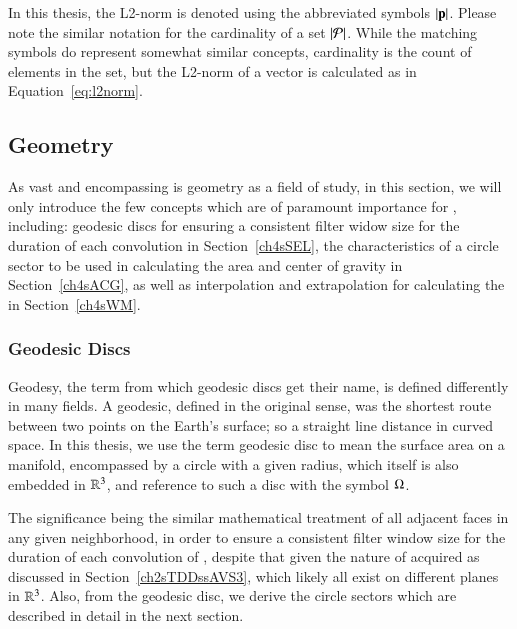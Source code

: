 In this thesis, the L2-norm is denoted using the abbreviated symbols $|\mathbf{p}|$. Please note the similar notation for the cardinality of a set $|\mathcal{P}|$. While the matching symbols do represent somewhat similar concepts, cardinality is the count of elements in the set, but the L2-norm of a vector is calculated as in Equation~\ref{eq:l2norm}.~\cite[p.~26]{Mara12}

%
%
%
%
\subsection{Geometry}
\label{ch2sETBssG}
As vast and encompassing is geometry as a field of study, in this section, we will only introduce the few concepts which are of paramount importance for , including: geodesic discs for ensuring a consistent filter widow size for the duration of each convolution in Section~\ref{ch4sSEL}, the characteristics of a circle sector to be used in calculating the area and center of gravity in Section~\ref{ch4sACG}, as well as interpolation and extrapolation for calculating the  in Section~\ref{ch4sWM}.

%
%
\subsubsection{Geodesic Discs}
\label{ch2sETBssGsssGD}
Geodesy, the term from which geodesic discs get their name, is defined differently in many fields. A geodesic, defined in the original sense, was the shortest route between two points on the Earth's surface; so a straight line distance in curved space. In this thesis, we use the term geodesic disc to mean the surface area on a manifold, encompassed by a circle with a given radius, which itself is also embedded in $\mathbb{R}^{3}$, and reference to such a disc with the symbol $\Omega$.

The significance being the similar mathematical treatment of all adjacent faces in any given neighborhood, in order to ensure a consistent filter window size for the duration of each convolution of , despite that given the nature of acquired \tdd{} as discussed in Section~\ref{ch2sTDDssAVS3}, which likely all exist on different planes in $\mathbb{R}^{3}$. Also, from the geodesic disc, we derive the circle sectors which are described in detail in the next section.
%
%

